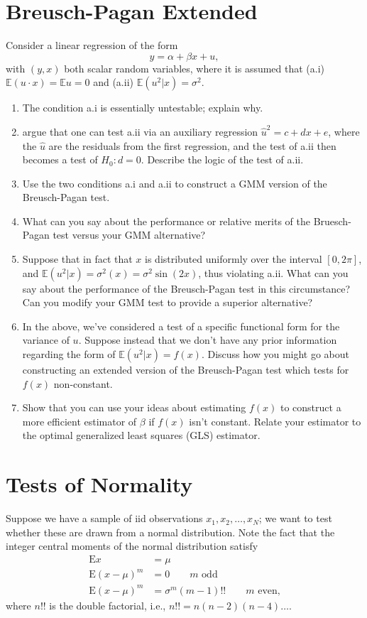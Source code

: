 \documentclass[12pt]{amsart}
\renewcommand{\E}{\ensuremath{\mathds{E}}}
\begin{document}
\section{Breusch-Pagan Extended}
\label{sec:org5a0f79d}
Consider a linear regression of the form
\begin{equation}
   y = \alpha + \beta x + u,
\end{equation}
with \((y,x)\) both scalar random variables, where it is assumed that
(a.i) \(\E(u\cdot x) = \E u = 0\) and (a.ii) \(\E(u^2|x)=\sigma^2\).
\begin{enumerate}
\item The condition a.i is essentially untestable; explain why.
\item \textcite{breusch-pagan79} argue that one can test a.ii via an
auxiliary regression \(\hat{u}^2 = c + d x + e\), where the \(\hat{u}\)
are the residuals from the first regression, and the test of a.ii
then becomes a test of \(H_0:d=0\).   Describe the logic of
the test of a.ii.
\item Use the two conditions a.i and a.ii to construct a GMM version of
the Breusch-Pagan test.
\item What can you say  about the performance or relative merits of the
Bruesch-Pagan test versus your GMM alternative?
\item Suppose that in fact that \(x\) is distributed uniformly over the
interval \([0,2\pi]\), and \(\E(u^2|x)=\sigma^2(x)=\sigma^2\sin(2x)\), thus
violating a.ii.  What can you say about the performance of the
Breusch-Pagan test in this circumstance?  Can you modify your GMM
test to provide a superior alternative?
\item In the above, we've considered a test of a specific functional
form for the variance of \(u\).  Suppose instead that we don't have
any prior information regarding the form of \(\E(u^2|x)=f(x)\).
Discuss how you might go about constructing an extended version
of the Breusch-Pagan test which tests for \(f(x)\) non-constant.
\item Show that you can use your ideas about estimating \(f(x)\) to
construct a more efficient estimator of \(\beta\) if \(f(x)\) isn't
constant.  Relate your estimator to the optimal generalized least
squares (GLS) estimator.
\end{enumerate}
\section{Tests of Normality}
\label{sec:org3025e40}
Suppose we have a sample of iid observations \(x_1,x_2,\dots,x_N\); we
want to test whether these are drawn from a normal distribution.
Note the fact that the integer central moments of the normal
distribution satisfy
\begin{align*}
 \mbox{E} x &= \mu\\
 \mbox{E}(x-\mu)^m &= 0\qquad\text{$m$ odd}\\
 \mbox{E}(x-\mu)^m &= \sigma^m(m-1)!!\qquad\text{$m$ even,}
\end{align*}
where \(n!!\) is the double factorial, i.e., \(n!!=n(n-2)(n-4)\dots\).
\end{document}
